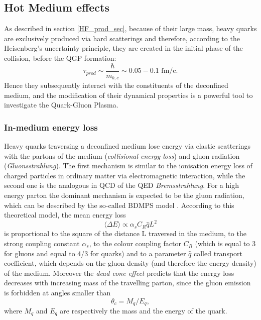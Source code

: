 \documentclass[b5paper,10pt,twoside,oldstyle,classica]{toptesi}
\begin{document}
\subsection{Hot Medium effects}
As described in section \ref{HF_prod_sec}, because of their large mass, heavy quarks are exclusively produced via hard scatterings and therefore, according to the Heisenberg's uncertainty principle, they are created in the initial phase of the collision, before the QGP formation:
\begin{equation}
 \tau_{prod} \sim \frac{\hbar}{m_{b,c}} \sim 0.05 - 0.1\text{ fm/c}.
\end{equation}
Hence they subsequently interact with the constituents of the deconfined medium, and the modification of their dynamical properties is a powerful tool to investigate the Quark-Gluon Plasma. 
\subsubsection{In-medium energy loss}
\label{HF_AA}
Heavy quarks traversing a deconfined medium lose energy via elastic scatterings with the partons of the medium (\textit{collisional energy loss}) and gluon radiation (\textit{Gluonsstrahlung}). The first mechanism is similar to the ionisation energy loss of charged particles in ordinary matter via electromagnetic interaction, while the second one is the analogous in QCD of the QED \textit{Bremsstrahlung}. For a high energy parton the dominant mechanism is expected to be the gluon radiation, which can be described by the so-called BDMPS model \cite{Baier:1996sk}. According to this theoretical model, the mean energy loss 
\begin{equation}
 \langle \Delta E \rangle \propto \alpha_s C_R \hat{q} L^2
\end{equation}
is proportional to the square of the distance L traversed in the medium, to the strong coupling constant $\alpha_s$, to the colour coupling factor $C_R$ (which is equal to 3 for gluons and equal to 4/3 for quarks) and to a parameter $\hat{q}$ called transport coefficient, which depends on the gluon density (and therefore the energy density) of the medium. Moreover the \textit{dead cone effect} \cite{Djordjevic:2003qk} predicts that the energy loss decreases with increasing mass of the travelling parton, since the gluon emission is forbidden at angles smaller than 
\begin{equation}
\theta_c = M_q/E_q,
\end{equation}
where $M_q$ and $E_q$ are respectively the mass and the energy of the quark.
\end{document}
